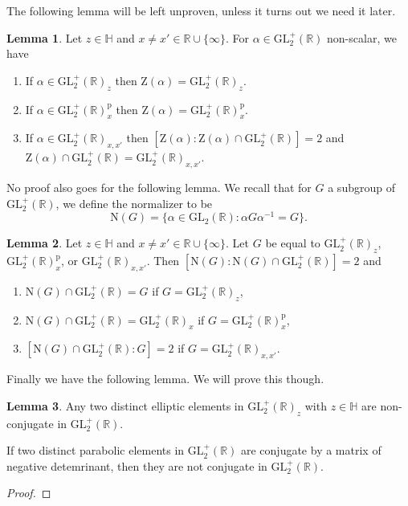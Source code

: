 \documentclass{article}
\theoremstyle{definition}
\newtheorem{lem}{Lemma}
\begin{document}
The following lemma will be left unproven, unless it turns out we need it later.
\begin{lem}
	Let $z\in\mathbb{H}$ and $x\neq x'\in\mathbb{R}\cup\{\infty\}$. For $\alpha\in\mathrm{GL}_2^+(\mathbb{R})$ non-scalar, we have
	\begin{enumerate}
		\item If $\alpha\in\mathrm{GL}_2^+(\mathbb{R})_z$ then $\mathrm{Z}(\alpha)=\mathrm{GL}_2^+(\mathbb{R})_z$.
		\item If $\alpha\in\mathrm{GL}_2^+(\mathbb{R})_x^\mathrm{p}$ then $\mathrm{Z}(\alpha)=\mathrm{GL}_2^+(\mathbb{R})_x^\mathrm{p}$.
		\item If $\alpha\in\mathrm{GL}_2^+(\mathbb{R})_{x,x'}$ then $[\mathrm{Z}(\alpha):\mathrm{Z}(\alpha)\cap\mathrm{GL}_2^+(\mathbb{R})]=2$ and $\mathrm{Z}(\alpha)\cap\mathrm{GL}_2^+(\mathbb{R})=\mathrm{GL}_2^+(\mathbb{R})_{x,x'}$.
	\end{enumerate}
\end{lem}
No proof also goes for the following lemma. We recall that for $G$ a subgroup of $\mathrm{GL}_2^+(\mathbb{R})$, we define the normalizer to be
\[\mathrm{N}(G)=\{\alpha\in\mathrm{GL}_2(\mathbb{R}):\alpha G\alpha^{-1}=G\}.\]
\begin{lem}
	Let $z\in\mathbb{H}$ and $x\neq x'\in\mathbb{R}\cup\{\infty\}$. Let $G$ be equal to $\mathrm{GL}_2^+(\mathbb{R})_z$, $\mathrm{GL}_2^+(\mathbb{R})_x^\mathrm{p}$, or $\mathrm{GL}_2^+(\mathbb{R})_{x,x'}$. Then $[\mathrm{N}(G):\mathrm{N}(G)\cap\mathrm{GL}_2^+(\mathbb{R})]=2$ and
	\begin{enumerate}
		\item $\mathrm{N}(G)\cap\mathrm{GL}_2^+(\mathbb{R})=G$ if $G=\mathrm{GL}_2^+(\mathbb{R})_z$,
		\item $\mathrm{N}(G)\cap\mathrm{GL}_2^+(\mathbb{R})=\mathrm{GL}_2^+(\mathbb{R})_x$ if $G=\mathrm{GL}_2^+(\mathbb{R})_x^\mathrm{p}$,
		\item $[\mathrm{N}(G)\cap\mathrm{GL}_2^+(\mathbb{R}):G]=2$ if $G=\mathrm{GL}_2^+(\mathbb{R})_{x,x'}$.
	\end{enumerate}
\end{lem}
Finally we have the following lemma. We will prove this though.
\begin{lem}
	Any two distinct elliptic elements in $\mathrm{GL}_2^+(\mathbb{R})_z$ with $z\in\mathbb{H}$ are non-conjugate in $\mathrm{GL}_2^+(\mathbb{R})$.

	If two distinct parabolic elements in $\mathrm{GL}_2^+(\mathbb{R})$ are conjugate by a matrix of negative detemrinant, then they are not conjugate in $\mathrm{GL}_2^+(\mathbb{R})$.
\end{lem}
\begin{proof}
\end{proof}
\end{document}
